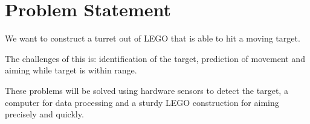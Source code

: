 \section{Problem Statement} 
We want to construct a turret out of LEGO that is able to hit a moving target.

The challenges of this is: identification of the target, prediction of movement and aiming while target is within range. 

These problems will be solved using hardware sensors to detect the target, a computer for data processing and a sturdy LEGO construction for aiming precisely and quickly.
